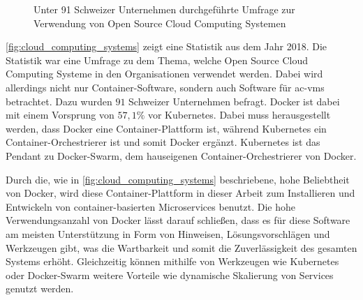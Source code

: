\begin{figure}[ht!]
  \vspace{.02\textheight}
  \centering
  \caption{Unter 91 Schweizer Unternehmen durchgeführte Umfrage zur Verwendung von Open Source Cloud Computing Systemen \parencite{stürmer2018cloudcomputing}}
  \label{fig:cloud_computing_systems}
\end{figure}

\autoref{fig:cloud_computing_systems} zeigt eine Statistik aus dem Jahr 2018. Die Statistik war eine Umfrage zu dem Thema, welche Open Source Cloud Computing Systeme in den Organisationen verwendet werden. Dabei wird allerdings nicht nur Container-Software, sondern auch Software für \gls{ac-vm}s betrachtet. Dazu wurden $91$ Schweizer Unternehmen befragt. Docker ist dabei mit einem Vorsprung von $57,1\%$ vor Kubernetes. Dabei muss herausgestellt werden, dass Docker eine Container-Plattform ist, während Kubernetes ein Container-Orchestrierer ist und somit Docker ergänzt. Kubernetes ist das Pendant zu Docker-Swarm, dem hauseigenen Container-Orchestrierer von Docker.

Durch die, wie in \autoref{fig:cloud_computing_systems} beschriebene, hohe Beliebtheit von Docker, wird diese Container-Plattform in dieser Arbeit zum Installieren und Entwickeln von container-basierten Microservices benutzt. Die hohe Verwendungsanzahl von Docker lässt darauf schließen, dass es für diese Software am meisten Unterstützung in Form von Hinweisen, Lösungsvorschlägen und Werkzeugen gibt, was die Wartbarkeit und somit die Zuverlässigkeit des gesamten Systems erhöht. Gleichzeitig können mithilfe von Werkzeugen wie Kubernetes oder Docker-Swarm weitere Vorteile wie dynamische Skalierung von Services genutzt werden.

